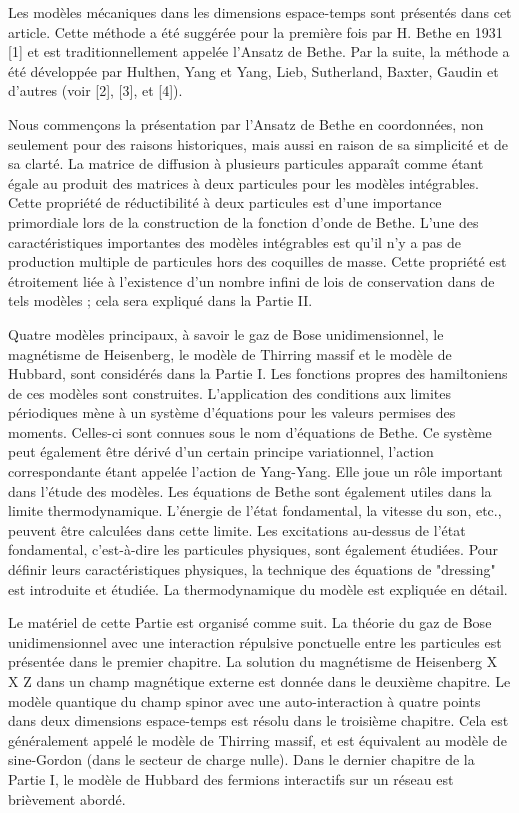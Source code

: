 Les modèles mécaniques dans les dimensions espace-temps sont présentés dans cet article. Cette méthode a été suggérée pour la première fois par H. Bethe en 1931 [1] et est traditionnellement appelée l'Ansatz de Bethe. Par la suite, la méthode a été développée par Hulthen, Yang et Yang, Lieb, Sutherland, Baxter, Gaudin et d'autres (voir [2], [3], et [4]).

Nous commençons la présentation par l'Ansatz de Bethe en coordonnées, non seulement pour des raisons historiques, mais aussi en raison de sa simplicité et de sa clarté. {\color{red} La matrice de diffusion à plusieurs particules apparaît comme étant égale au produit des matrices à deux particules pour les modèles intégrables. Cette propriété de réductibilité à deux particules est d'une importance primordiale lors de la construction de la fonction d'onde de Bethe. L'une des caractéristiques importantes des modèles intégrables est qu'il n'y a pas de production multiple de particules hors des coquilles de masse. Cette propriété est étroitement liée à l'existence d'un nombre infini de lois de conservation dans de tels modèles ; cela sera expliqué dans la Partie II.}

Quatre modèles principaux, à savoir le gaz de Bose unidimensionnel, le magnétisme de Heisenberg, le modèle de Thirring massif et le modèle de Hubbard, sont considérés dans la Partie I. Les fonctions propres des hamiltoniens de ces modèles sont construites. {\color{red} L'application des conditions aux limites périodiques mène à un système d'équations pour les valeurs permises des moments. Celles-ci sont connues sous le nom d'équations de Bethe. Ce système peut également être dérivé d'un certain principe variationnel, l'action correspondante étant appelée l'action de Yang-Yang. Elle joue un rôle important dans l'étude des modèles. Les équations de Bethe sont également utiles dans la limite thermodynamique. L'énergie de l'état fondamental, la vitesse du son, etc., peuvent être calculées dans cette limite. Les excitations au-dessus de l'état fondamental, c'est-à-dire les particules physiques, sont également étudiées. Pour définir leurs caractéristiques physiques, la technique des équations de "dressing" est introduite et étudiée. La thermodynamique du modèle est expliquée en détail.}

Le matériel de cette Partie est organisé comme suit. La théorie du gaz de Bose unidimensionnel avec une interaction répulsive ponctuelle entre les particules est présentée dans le premier chapitre. La solution du magnétisme de Heisenberg X X Z dans un champ magnétique externe est donnée dans le deuxième chapitre. Le modèle quantique du champ spinor avec une auto-interaction à quatre points dans deux dimensions espace-temps est résolu dans le troisième chapitre. Cela est généralement appelé le modèle de Thirring massif, et est équivalent au modèle de sine-Gordon (dans le secteur de charge nulle). Dans le dernier chapitre de la Partie I, le modèle de Hubbard des fermions interactifs sur un réseau est brièvement abordé.